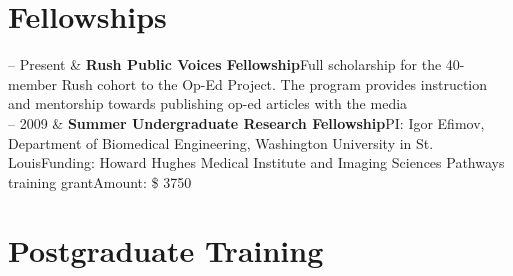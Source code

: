 \documentclass[10pt, letterpaper]{article}
\newcommand{\WASHU}{Washington University in St. Louis}
\newcommand{\Duration}[2]{\fontsize{9pt}{0}\selectfont #1 -- #2}
\newcommand{\Ongoing}{Present} %
\newcommand{\Appointment}[4]{\textbf{#1}\newline  #2\newline  #3\newline  #4}
\newcommand{\Twoline}[2]{\textbf{#1}\newline  #2}
\begin{document}
\section{Fellowships}

\begin{EntriesTable}
  \Duration{2021}{\Ongoing} &
  \Twoline{Rush Public Voices Fellowship}
  {Full scholarship for the 40-member Rush cohort to the Op-Ed Project. \newline The program provides instruction and mentorship towards publishing op-ed articles with the media}
  \\

  \Duration{2009}{2009}  &
  \Appointment{Summer Undergraduate Research Fellowship}
  {PI: Igor Efimov, Department of Biomedical Engineering, {\WASHU}}
  {Funding: Howard Hughes Medical Institute and Imaging Sciences Pathways training grant}
  {Amount: \$ 3750}
\end{EntriesTable}


\section{Postgraduate Training}
\end{document}
